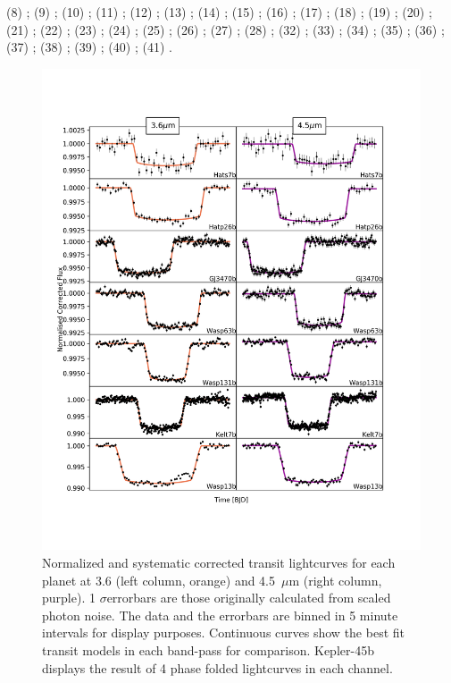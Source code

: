 \begin{subappendices}
{\begin{landscape}
{    (8) \citet{Doyle2011}; (9) \citet{Esteves2015}; (10) \citet{Faedi2011};
    (11) \citet{Hartman2009}; (12) \citet{Hartman2011b}; (13) \citet{Hartman2011c};
    (14) \citet{Hartman2011a}; (15) \citet{Hoyer2013}; (16) \citet{Johnson2012};
    (17) \citet{Maciejewski2014}; (18) \citet{Maciejewski2016}; (19) \citet{Nikolov2014};
    (20) \citet{Petrucci2013}; (21) \citet{Seeliger2015}; (22) \citet{Sozzetti2007};
    (23) \citet{Mocnik2017}; (24) \citet{Barros2012}; (25) \citet{Skillen2009};
    (26) \citet{Delrez2016}; (27) \citet{Holman2010}; (28) \citet{Torres2011};
    (32) \citet{Stassun2017}; (33) \citet{Stassun2018}; (34) \citet{Stassun2019};
    (35) \citet{Anderson2014}; (36) \citet{Hellier2012}; (37) \citet{Bakos2015};
    (38) \citet{Hellier2010}; (39) \citet{Hellier2017}; (40) \citet{Mancini2016};
    (41) \citet{Neveu-VanMalle2014}.}
  \end{landscape}
  }


  \begin{figure}[!b]
    \includegraphics[trim={0 2cm 0 0},clip,width=\textwidth]{CorrectedLighctuves0.pdf}
    \caption{Normalized and systematic corrected transit lightcurves for each planet  at 3.6 (left column, orange) and 4.5~$\mu$m (right column, purple). 1 $\sigma$errorbars are those originally calculated from scaled photon noise. The data and the errorbars are binned in 5 minute intervals for display purposes. Continuous curves show the best fit transit models in each band-pass for comparison. Kepler-45b displays the result of 4 phase folded lightcurves in each channel.}
    \label{P1:fig:normlc}
  \end{figure}


\end{subappendices}

